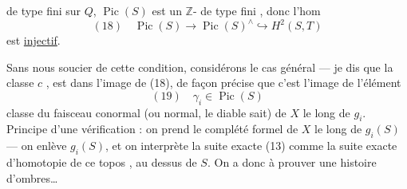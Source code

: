 de type fini sur $Q$, $\operatorname{Pic}(S)$ est un $\mathbb Z$- de type fini , donc l'hom
\[
(18)\quad \operatorname{Pic}(S)\longrightarrow\operatorname{Pic}(S)^\wedge\hookrightarrow H^2(S,T)
\]
est \uline{injectif}.

Sans nous soucier de cette condition,  considérons le cas général --- je dis que la classe  $c$ , est dans l'image de (18), de façon précise que c'est l'image de l'élément
\[
(19)\quad \gamma_i\in\operatorname{Pic}(S)
\]
classe du faisceau conormal (ou normal, le diable sait) de $X$ le long de $g_i$. Principe d'une vérification : on prend le complété formel de $X$ le long de $g_i(S)$    --- on enlève $g_i(S)$, et on interprète la suite exacte (13) comme la suite exacte d'homotopie de ce  topos , au dessus de  $S$. On a donc à prouver une histoire d'ombres\dots
{}
